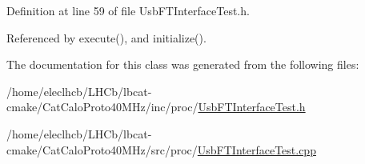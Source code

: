 Definition at line 59 of file Usb\+F\+T\+Interface\+Test.\+h.



Referenced by execute(), and initialize().



The documentation for this class was generated from the following files\+:\begin{DoxyCompactItemize}
\item 
/home/eleclhcb/\+L\+H\+Cb/lbcat-\/cmake/\+Cat\+Calo\+Proto40\+M\+Hz/inc/proc/\hyperlink{UsbFTInterfaceTest_8h}{Usb\+F\+T\+Interface\+Test.\+h}\item 
/home/eleclhcb/\+L\+H\+Cb/lbcat-\/cmake/\+Cat\+Calo\+Proto40\+M\+Hz/src/proc/\hyperlink{UsbFTInterfaceTest_8cpp}{Usb\+F\+T\+Interface\+Test.\+cpp}\end{DoxyCompactItemize}
